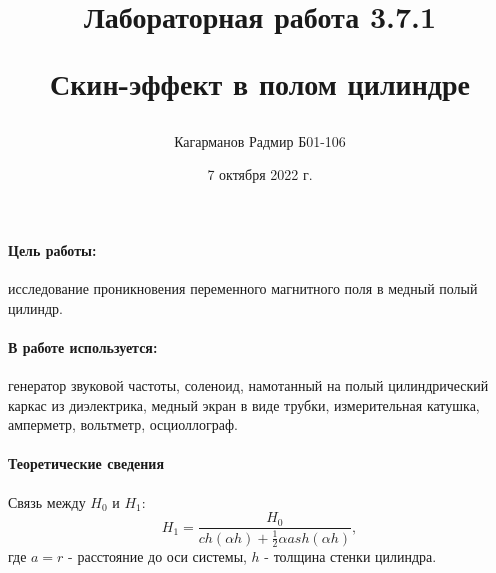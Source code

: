 \documentclass[a4paper,12pt]{article}
\title{Лабораторная работа 3.7.1 

Скин-эффект в полом цилиндре}
\author{Кагарманов Радмир Б01-106}
\date{7 октября 2022 г.}
\begin{document}
\maketitle
\thispagestyle{empty}
\newpage
\setcounter{page}{1}

\paragraph{Цель работы:}исследование проникновения переменного магнитного поля в медный полый цилиндр.

\paragraph{В работе используется:}генератор звуковой частоты, соленоид, намотанный на полый цилиндрический каркас из диэлектрика, медный экран в виде трубки, измерительная катушка, амперметр, вольтметр, осциоллограф.

\paragraph{Теоретические сведения\\}
Связь между $H_0$ и $H_1$:
\begin{equation}
    H_1=\frac{H_0}{ch(\alpha h) + \frac{1}{2}\alpha a sh(\alpha h)},
\end{equation}
где $a=r$ - расстояние до оси системы, $h$ - толщина стенки цилиндра.\par
\end{document}
